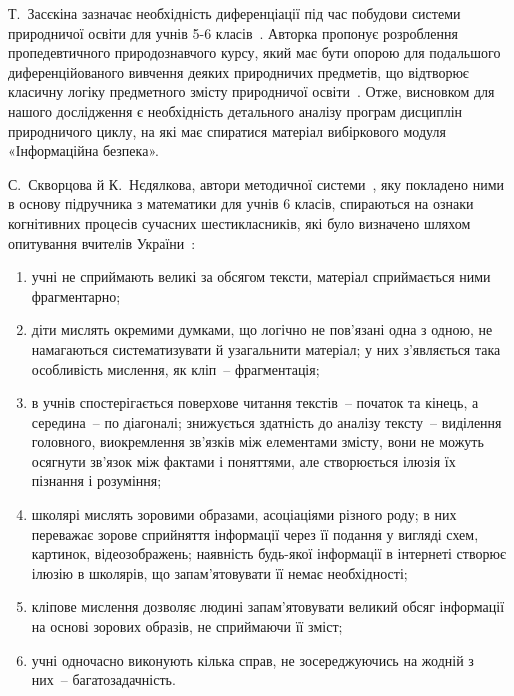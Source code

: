 Т.~Засєкіна зазначає необхідність диференціації під час побудови системи природничої освіти для учнів 5-6 класів~\cite{Засекіна_2020}. Авторка пропонує розроблення пропедевтичного природознавчого курсу, який має бути опорою для подальшого диференційованого вивчення деяких природничих предметів, що відтворює класичну логіку предметного змісту природничої освіти~\cite{Засекіна_2020}. Отже, висновком для нашого дослідження є необхідність детального аналізу програм дисциплін природничого циклу, на які має спиратися матеріал вибіркового модуля «Інформаційна безпека».

С.~Скворцова й К.~Нєдялкова, автори методичної системи~\cite{Скворцова_Нєдялкова_2023}, яку покладено ними в основу підручника з математики для учнів 6 класів, спираються на ознаки когнітивних процесів сучасних шестикласників, які було визначено шляхом опитування вчителів України~\cite{SKVORTSOVA2021CLI, Скворцова_Нєдялкова_2023}:
\begin{enumerate} [label=\arabic*)]%
\item учні не сприймають великі за обсягом тексти, матеріал сприймається ними фрагментарно; 
\item діти мислять окремими думками, що логічно не пов’язані одна з одною, не намагаються систематизувати й узагальнити матеріал; у них з’являється така особливість мислення, як кліп~-- фрагментація; 
\item в учнів спостерігається поверхове читання текстів~-- початок та кінець, а середина~-- по діагоналі; знижується здатність до аналізу тексту~-- виділення головного, виокремлення зв’язків між елементами змісту, вони не можуть осягнути зв’язок між фактами і поняттями, але створюється ілюзія їх пізнання і розуміння; 
\item школярі мислять зоровими образами, асоціаціями різного роду; в них переважає зорове сприйняття інформації через її подання у вигляді схем, картинок, відеозображень; наявність будь-якої інформації в інтернеті створює ілюзію в школярів, що запам’ятовувати її немає необхідності; 
\item кліпове мислення дозволяє людині запам’ятовувати великий обсяг інформації на основі зорових образів, не сприймаючи її зміст; 
\item учні одночасно виконують кілька справ, не зосереджуючись на жодній з них~-- багатозадачність.
\end{enumerate}

